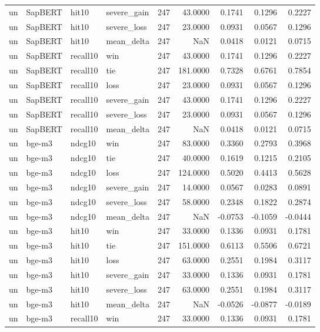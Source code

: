 \begin{tabular}{llllrrrrr}
un & SapBERT & hit10 & severe\_gain & 247 & 43.0000 & 0.1741 & 0.1296 & 0.2227 \\
un & SapBERT & hit10 & severe\_loss & 247 & 23.0000 & 0.0931 & 0.0567 & 0.1296 \\
un & SapBERT & hit10 & mean\_delta & 247 & NaN & 0.0418 & 0.0121 & 0.0715 \\
un & SapBERT & recall10 & win & 247 & 43.0000 & 0.1741 & 0.1296 & 0.2227 \\
un & SapBERT & recall10 & tie & 247 & 181.0000 & 0.7328 & 0.6761 & 0.7854 \\
un & SapBERT & recall10 & loss & 247 & 23.0000 & 0.0931 & 0.0567 & 0.1296 \\
un & SapBERT & recall10 & severe\_gain & 247 & 43.0000 & 0.1741 & 0.1296 & 0.2227 \\
un & SapBERT & recall10 & severe\_loss & 247 & 23.0000 & 0.0931 & 0.0567 & 0.1296 \\
un & SapBERT & recall10 & mean\_delta & 247 & NaN & 0.0418 & 0.0121 & 0.0715 \\
un & bge-m3 & ndcg10 & win & 247 & 83.0000 & 0.3360 & 0.2793 & 0.3968 \\
un & bge-m3 & ndcg10 & tie & 247 & 40.0000 & 0.1619 & 0.1215 & 0.2105 \\
un & bge-m3 & ndcg10 & loss & 247 & 124.0000 & 0.5020 & 0.4413 & 0.5628 \\
un & bge-m3 & ndcg10 & severe\_gain & 247 & 14.0000 & 0.0567 & 0.0283 & 0.0891 \\
un & bge-m3 & ndcg10 & severe\_loss & 247 & 58.0000 & 0.2348 & 0.1822 & 0.2874 \\
un & bge-m3 & ndcg10 & mean\_delta & 247 & NaN & -0.0753 & -0.1059 & -0.0444 \\
un & bge-m3 & hit10 & win & 247 & 33.0000 & 0.1336 & 0.0931 & 0.1781 \\
un & bge-m3 & hit10 & tie & 247 & 151.0000 & 0.6113 & 0.5506 & 0.6721 \\
un & bge-m3 & hit10 & loss & 247 & 63.0000 & 0.2551 & 0.1984 & 0.3117 \\
un & bge-m3 & hit10 & severe\_gain & 247 & 33.0000 & 0.1336 & 0.0931 & 0.1781 \\
un & bge-m3 & hit10 & severe\_loss & 247 & 63.0000 & 0.2551 & 0.1984 & 0.3117 \\
un & bge-m3 & hit10 & mean\_delta & 247 & NaN & -0.0526 & -0.0877 & -0.0189 \\
un & bge-m3 & recall10 & win & 247 & 33.0000 & 0.1336 & 0.0931 & 0.1781 \\

\end{tabular}
